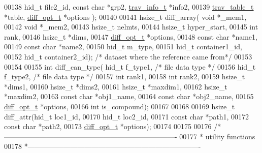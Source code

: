 \begin{DoxyCode}
00138                     hid\_t file2\_id, \textcolor{keyword}{const} \textcolor{keywordtype}{char} *grp2, \hyperlink{structtrav__info__t}{trav\_info\_t} *info2,
00139                     \hyperlink{structtrav__table__t}{trav\_table\_t} *table, \hyperlink{structdiff__opt__t}{diff\_opt\_t} *options );
00140 
00141 hsize\_t diff\_array( \textcolor{keywordtype}{void} *\_mem1,
00142                     \textcolor{keywordtype}{void} *\_mem2,
00143                     hsize\_t nelmts,
00144                     hsize\_t hyper\_start,
00145                     \textcolor{keywordtype}{int} rank,
00146                     hsize\_t *dims,
00147                     \hyperlink{structdiff__opt__t}{diff\_opt\_t} *options,
00148                     \textcolor{keyword}{const} \textcolor{keywordtype}{char} *name1,
00149                     \textcolor{keyword}{const} \textcolor{keywordtype}{char} *name2,
00150                     hid\_t m\_type,
00151                     hid\_t container1\_id,
00152                     hid\_t container2\_id); \textcolor{comment}{/* dataset where the reference came from*/}
00153 
00154 
00155 \textcolor{keywordtype}{int} diff\_can\_type( hid\_t       f\_type1, \textcolor{comment}{/* file data type */}
00156                    hid\_t       f\_type2, \textcolor{comment}{/* file data type */}
00157                    \textcolor{keywordtype}{int}         rank1,
00158                    \textcolor{keywordtype}{int}         rank2,
00159                    hsize\_t     *dims1,
00160                    hsize\_t     *dims2,
00161                    hsize\_t     *maxdim1,
00162                    hsize\_t     *maxdim2,
00163                    \textcolor{keyword}{const} \textcolor{keywordtype}{char}  *obj1\_name,
00164                    \textcolor{keyword}{const} \textcolor{keywordtype}{char}  *obj2\_name,
00165                    \hyperlink{structdiff__opt__t}{diff\_opt\_t}  *options,
00166                    \textcolor{keywordtype}{int}         is\_compound);
00167 
00168 
00169 hsize\_t diff\_attr(hid\_t loc1\_id,
00170                   hid\_t loc2\_id,
00171                   \textcolor{keyword}{const} \textcolor{keywordtype}{char} *path1,
00172                   \textcolor{keyword}{const} \textcolor{keywordtype}{char} *path2,
00173                   \hyperlink{structdiff__opt__t}{diff\_opt\_t} *options);
00174 
00175 
00176 \textcolor{comment}{/*-------------------------------------------------------------------------}
00177 \textcolor{comment}{ * utility functions}
00178 \textcolor{comment}{ *-------------------------------------------------------------------------}

\end{DoxyCode}
